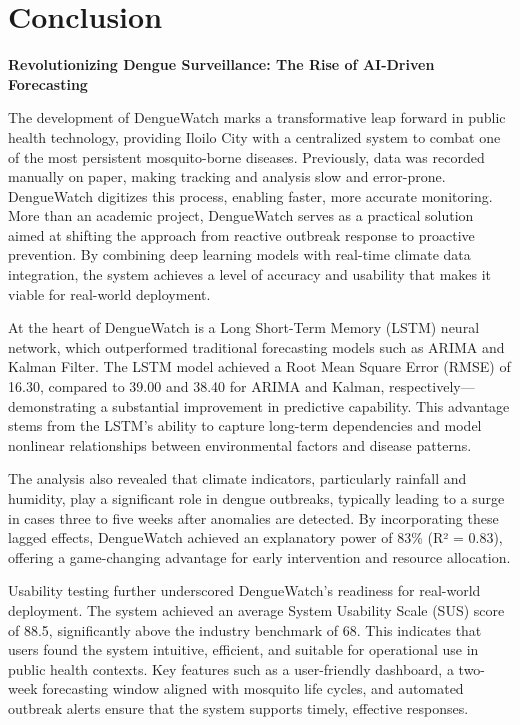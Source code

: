 \chapter{Conclusion}
\textbf{Revolutionizing Dengue Surveillance: The Rise of AI-Driven Forecasting}

The development of DengueWatch marks a transformative leap forward in public health technology, providing Iloilo City with a centralized system to combat one of the most persistent mosquito-borne diseases. Previously, data was recorded manually on paper, making tracking and analysis slow and error-prone. DengueWatch digitizes this process, enabling faster, more accurate monitoring. More than an academic project, DengueWatch serves as a practical solution aimed at shifting the approach from reactive outbreak response to proactive prevention. By combining deep learning models with real-time climate data integration, the system achieves a level of accuracy and usability that makes it viable for real-world deployment.

At the heart of DengueWatch is a Long Short-Term Memory (LSTM) neural network, which outperformed traditional forecasting models such as ARIMA and Kalman Filter. The LSTM model achieved a Root Mean Square Error (RMSE) of 16.30, compared to 39.00 and 38.40 for ARIMA and Kalman, respectively—demonstrating a substantial improvement in predictive capability. This advantage stems from the LSTM's ability to capture long-term dependencies and model nonlinear relationships between environmental factors and disease patterns.

The analysis also revealed that climate indicators, particularly rainfall and humidity, play a significant role in dengue outbreaks, typically leading to a surge in cases three to five weeks after anomalies are detected. By incorporating these lagged effects, DengueWatch achieved an explanatory power of 83\% (R² = 0.83), offering a game-changing advantage for early intervention and resource allocation.

Usability testing further underscored DengueWatch’s readiness for real-world deployment. The system achieved an average System Usability Scale (SUS) score of 88.5, significantly above the industry benchmark of 68. This indicates that users found the system intuitive, efficient, and suitable for operational use in public health contexts. Key features such as a user-friendly dashboard, a two-week forecasting window aligned with mosquito life cycles, and automated outbreak alerts ensure that the system supports timely, effective responses.

